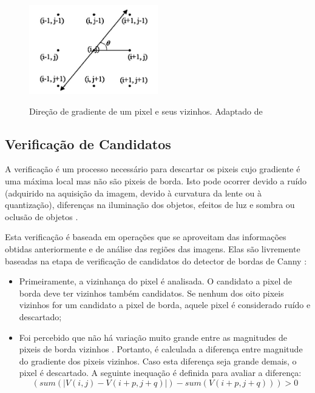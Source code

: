 
\begin{figure} [h]
\centering
\includegraphics[width = 0.5\textwidth]{figuras/vizinh.jpg} \label{maxlocal}
\caption{Direção de gradiente de um pixel e seus vizinhos. Adaptado de \cite{mrf}}
\end{figure}

\subsection{Verificação de Candidatos}

A verificação é um processo necessário para descartar os pixeis cujo gradiente é uma máxima local mas não são pixeis de borda. Isto pode ocorrer devido a ruído (adquirido na aquisição da imagem, devido à curvatura da lente ou à quantização), diferenças na iluminação dos objetos, efeitos de luz e sombra ou oclusão de objetos \cite{ruidocausas}.


Esta verificação é baseada em operações que se aproveitam das informações obtidas anteriormente e de análise das regiões das imagens. Elas são livremente baseadas na etapa de verificação de candidatos do detector de bordas de Canny \cite{canny}:


\begin{itemize}
\item Primeiramente, a vizinhança do pixel é analisada. O candidato a pixel de borda deve ter vizinhos também candidatos. Se nenhum dos oito pixeis vizinhos for um candidato a pixel de borda, aquele pixel é considerado ruído e descartado;
\item Foi percebido que não há variação muito grande entre as magnitudes de pixeis de borda vizinhos \cite{mrf}. Portanto, é calculada a diferença entre magnitude do gradiente dos pixeis vizinhos. Caso esta diferença seja grande demais, o pixel é descartado. A seguinte inequação é definida para avaliar a diferença:
\begin{equation}
(sum(| V(i,j) - V(i+p,j+q) |)- sum(V(i+p,j+q))) >0
\end{equation}


\end {itemize}

